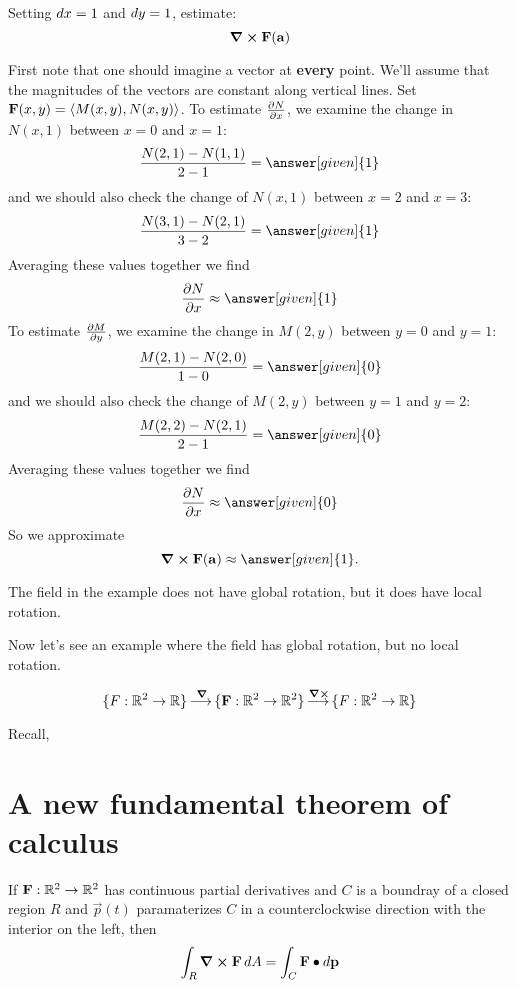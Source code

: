 \documentclass{ximera}
\begin{document}
\begin{example}
\begin{image}
      \end{image}
      Setting $\d x = 1$ and $\d y = 1$, estimate:
      \[
      \curl \vec{F}(\vec{a})
      \]
      \begin{explanation}
        First note that one should imagine a vector at \textbf{every}
        point. We'll assume that the magnitudes of the vectors are
        constant along vertical lines. Set $\vec{F}(x,y) =
        \vector{M(x,y),N(x,y)}$. To estimate $\pp[N]{x}$, we examine
        the change in $N(x,1)$ between $x=0$ and $x=1$:
        \[
        \frac{N(2,1) - N(1,1)}{2-1} = \answer[given]{1}
        \]
        and we should also check the change of $N(x,1)$ between $x=2$
        and $x=3$:
        \[
        \frac{N(3,1) - N(2,1)}{3-2} = \answer[given]{1}
        \]
        Averaging these values together we find
        \[
        \pp[N]{x} \approx \answer[given]{1}
        \]
        To estimate $\pp[M]{y}$, we examine the change in $M(2,y)$
        between $y=0$ and $y=1$:
        \[
        \frac{M(2,1) - N(2,0)}{1-0} = \answer[given]{0}
        \]
        and we should also check the change of $M(2,y)$ between $y=1$
        and $y=2$:
        \[
        \frac{M(2,2) - N(2,1)}{2-1} = \answer[given]{0}
        \]
        Averaging these values together we find
        \[
        \pp[N]{x} \approx \answer[given]{0}
        \]
        So we approximate
        \[
        \curl\vec{F}(\vec{a})\approx\answer[given]{1}.
        \]
      \end{explanation}
\end{example}

The field in the example does not have global rotation, but it does
have local rotation.

Now let's see an example where the field has global rotation, but no
local rotation.


\[
\{F:\R^2 \to \R\} \lto^{\grad} \{\vec{F}: \R^2 \to \R^2\} \lto^{\curl}
\{F:\R^2 \to \R\} 
\]



Recall,

\section{A new fundamental theorem of calculus}

\begin{theorem}
  If $\vec{F}:\R^2\to\R^2$ has continuous partial derivatives and $C$ is a
  boundray of a closed region $R$ and $\vec{p}(t)$ paramaterizes $C$
  in a counterclockwise direction with the interior on the left, then
  \[
  \int_R \curl\vec{F}\d A = \int_C \vec{F}\dotp\d\vec{p} 
  \]
\end{theorem}
\end{document}
